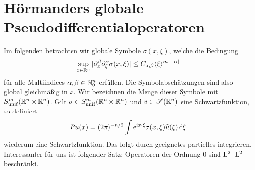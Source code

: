 \section{Hörmanders globale Pseudodifferentialoperatoren}

Im folgenden betrachten wir globale Symbole $\sigma(x,\xi)$, welche die Bedingung
\begin{equation}
    \sup_{x\in\mathbb R^n} |\partial_x^\beta\partial_\xi^\alpha \sigma(x,\xi)| \le C_{\alpha,\beta} \langle\xi\rangle^{m-|\alpha|}
\end{equation}
für alle Multiindices $\alpha,\beta\in\mathbb N_0^n$ erfüllen. Die Symbolabschätzungen sind also global gleichmäßig in $x$.
Wir bezeichnen die Menge dieser Symbole mit $S^m_{\rm unif}(\mathbb R^n\times\mathbb R^n)$. Gilt $\sigma\in S^m_{\rm unif}(\mathbb R^n\times\mathbb R^n)$
und $u\in\mathscr S(\mathbb R^n)$ eine Schwartzfunktion, so definiert
\begin{equation}\label{eq:6:6.17}
   Pu (x) = (2\pi)^{-n/2} \int \mathrm e^{\mathrm i x\cdot\xi} \sigma(x,\xi) \widehat u(\xi)\,\mathrm d\xi
\end{equation}
wiederum eine Schwartzfunktion. Das folgt durch geeignetes partielles integrieren. Interessanter für uns ist folgender Satz; Operatoren der Ordnung $0$ sind $\mathrm L^2$--$\mathrm L^2$-beschränkt.
 
